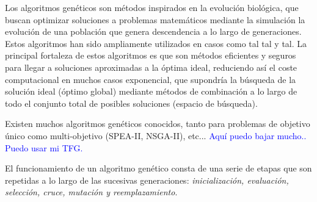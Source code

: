 \documentclass{uathesis-es}
\begin{document}
Los algoritmos genéticos son métodos inspirados en la evolución biológica, que buscan optimizar soluciones a problemas matemáticos mediante la simulación la evolución de una población que genera descendencia a lo largo de generaciones. Estos algoritmos han sido ampliamente utilizados en casos como tal tal y tal. La principal fortaleza de estos algoritmos es que son métodos eficientes y seguros para llegar a soluciones aproximadas a la óptima ideal, reduciendo así el coste computacional en muchos casos exponencial, que supondría la búsqueda de la solución ideal (óptimo global) mediante métodos de combinación a lo largo de todo el conjunto total de posibles soluciones (espacio de búsqueda).

Existen muchos algoritmos genéticos conocidos, tanto para problemas de objetivo único como multi-objetivo (SPEA-II, NSGA-II), etc... \textcolor{blue}{Aquí puedo bajar mucho.. Puedo usar mi TFG.}

El funcionamiento de un algoritmo genético consta de una serie de etapas que son repetidas a lo largo de las sucesivas generaciones: \textit{inicialización, evaluación, selección, cruce, mutación y reemplazamiento}.
\end{document}
